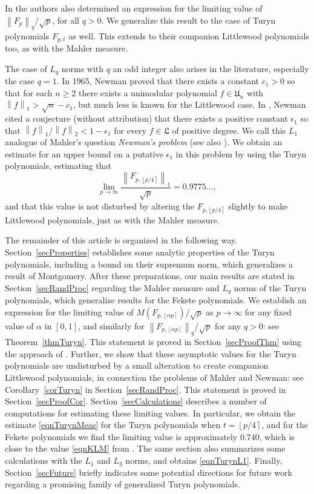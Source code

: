 \documentclass[reqno]{amsart}
\numberwithin{equation}{section}
\numberwithin{table}{section}
\numberwithin{figure}{section}
\newcommand{\dbars}[1]{\left\lVert#1\right\rVert}
\newcommand{\round}[1]{\left\lfloor#1\right\rceil}
\begin{document}
In \cite{KLM23} the authors also determined an expression for the limiting value of $\dbars{F_p}_q/\sqrt{p}$, for all $q>0$.
We generalize this result to the case of Turyn polynomials $F_{p,t}$ as well.
This extends to their companion Littlewood polynomials too, as with the Mahler measure.

The case of $L_q$ norms with $q$ an odd integer also arises in the literature, especially the case $q=1$.
In 1965, Newman \cite{Newman65} proved that there exists a constant $c_1>0$ so that for each $n\geq2$ there exists a unimodular polynomial $f\in\mathfrak{U}_n$ with $\dbars{f}_1>\sqrt{n}-c_1$, but much less is known for the Littlewood case.
In \cite{Newman60}, Newman cited a conjecture (without attribution) that there exists a positive constant $\epsilon_1$ so that $\dbars{f}_1/\dbars{f}_2 < 1-\epsilon_1$ for every $f\in\mathfrak{L}$ of positive degree.
We call this $L_1$ analogue of Mahler's question \textit{Newman's problem} (see also \cite[Section~5]{BM08}).
We obtain an estimate for an upper bound on a putative $\epsilon_1$ in this problem by using the Turyn polynomials, estimating that
\begin{equation}\label{eqnTurynL1}
\lim_{p\to\infty} \frac{\dbars{F_{p,\round{p/4}}}_1}{\sqrt{p}} = 0.9775\ldots,
\end{equation}
and that this value is not disturbed by altering the $F_{p,\round{p/4}}$ slightly to make Littlewood polynomials, just as with the Mahler measure.

The remainder of this article is organized in the following way.
Section~\ref{secProperties} establishes some analytic properties of the Turyn polynomials, including a bound on their supremum norm, which generalizes a result of Montgomery. 
After these preparations, our main results are stated in Section~\ref{secRandProc} regarding the Mahler measure and $L_q$ norms of the Turyn polynomials, which generalize results for the Fekete polynomials.
We establish an expression for the limiting value of $M(F_{p,\round{\alpha p}})/\sqrt{p}$ as $p\to\infty$ for any fixed value of $\alpha$ in $[0,1]$, and similarly for $\dbars{F_{p,\round{\alpha p}}}_q/\sqrt{p}$ for any $q>0$: see Theorem~\ref{thmTuryn}.
This statement is proved in Section~\ref{secProofThm} using the approach of \cite{KLM23}.
Further, we show that these asymptotic values for the Turyn polynomials are undisturbed by a small alteration to create companion Littlewood polynomials, in connection the problems of Mahler and Newman: see Corollary~\ref{corTuryn} in Section~\ref{secRandProc}.
This statement is proved in Section~\ref{secProofCor}.
Section~\ref{secCalculations} describes a number of computations for estimating these limiting values.
In particular, we obtain the estimate \eqref{eqnTurynMeas} for the Turyn polynomials when $t=\round{p/4}$, and for the Fekete polynomials we find the limiting value is approximately $0.740$, which is close to the value \eqref{eqnKLM} from \cite{KLM23}.
The same section also summarizes some calculations with the $L_1$ and $L_3$ norms, and obtains \eqref{eqnTurynL1}.
Finally, Section~\ref{secFuture} briefly indicates some potential directions for future work regarding a promising family of generalized Turyn polynomials.
\end{document}
